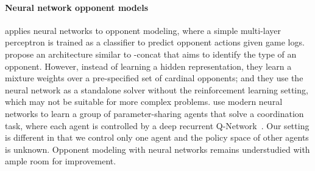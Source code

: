 \paragraph{Neural network opponent models}
\citet{davidson99opponent} applies neural networks to opponent modeling, where a simple multi-layer perceptron is trained as a classifier to predict opponent actions given game logs.
\citet{Lockett07evolvingexplicit} propose an architecture similar to \dron{}-concat that aims to identify the type of an opponent.
However, instead of learning a hidden representation, they learn a mixture weights over a pre-specified set of cardinal opponents;
and they use the neural network as a standalone solver without the reinforcement learning setting, which may not be suitable for more complex problems.
\citet{foerster16riddle} use modern neural networks to learn a group of parameter-sharing agents that solve a coordination task,
where each agent is controlled by a deep recurrent Q-Network~\cite{drqn}.
Our setting is different in that we control only one agent and the policy space of other agents is unknown.
Opponent modeling with neural networks remains understudied with ample room for improvement.
